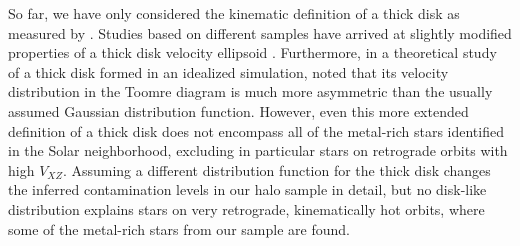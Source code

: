 \documentclass[apj, twocolappendix, numberedappendix, appendixfloats]{emulateapj}
\begin{document}
So far, we have only considered the kinematic definition of a thick disk as measured by \citet{bensby2003}.
Studies based on different samples have arrived at slightly modified properties of a thick disk velocity ellipsoid \citep[e.g.,][]{soubiran2003, carollo2010}.
Furthermore, in a theoretical study of a thick disk formed in an idealized simulation, \citet{sb2009} noted that its velocity distribution in the Toomre diagram is much more asymmetric than the usually assumed Gaussian distribution function.
However, even this more extended definition of a thick disk does not encompass all of the metal-rich stars identified in the Solar neighborhood, excluding in particular stars on retrograde orbits with high $V_{XZ}$.
Assuming a different distribution function for the thick disk changes the inferred contamination levels in our halo sample in detail, but no disk-like distribution explains stars on very retrograde, kinematically hot orbits, where some of the metal-rich stars from our sample are found.
\end{document}
